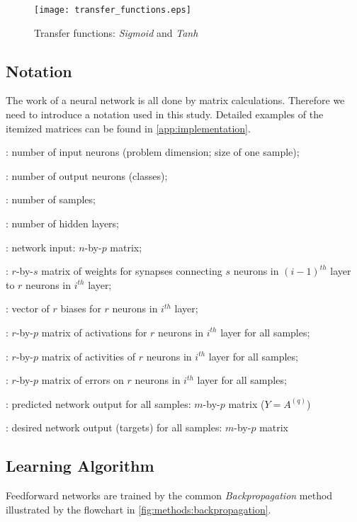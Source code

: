 \begin{figure}[H]
  \centering
  \texttt{[image: transfer\_functions.eps]}
  \caption{Transfer functions: \textit{Sigmoid} and \textit{Tanh}}
  \label{fig:methods:transfer_functions}
\end{figure}

\subsection*{Notation}
The work of a neural network is all done by matrix calculations. Therefore we need to introduce a notation used in this study. Detailed examples of the itemized matrices can be found in \cref{app:implementation}.

\begin{description}[leftmargin=!,labelwidth=\widthof{\bfseries $ W^{(i)} $}]
\item[$ n $] : number of input neurons (problem dimension; size of one sample);
\item[$ m $] : number of output neurons (classes);
\item[$ p $] : number of samples;
\item[$ q $] : number of hidden layers;
\item[$ X $] : network input: $ n $-by-$ p $ matrix;
\item[$ W^{(i)} $] : $ r $-by-$ s $ matrix of weights for synapses connecting $ s $ neurons in $ (i-1)^{th} $ layer to $ r $ neurons in $ i^{th} $ layer;
\item[$ B^{(i)} $] : vector of $ r $ biases for $ r $ neurons in $ i^{th} $ layer;
\item[$ Z^{(i)} $] : $ r $-by-$ p $ matrix of activations for $ r $ neurons in $ i^{th} $ layer for all samples;
\item[$ A^{(i)} $] : $ r $-by-$ p $ matrix of activities of $ r $ neurons in $ i^{th} $ layer for all samples;
\item[$ \Delta^{(i)} $] : $ r $-by-$ p $ matrix of errors on $ r $ neurons in $ i^{th} $ layer for all samples;
\item[$ Y $] : predicted network output for all samples: $ m $-by-$ p $ matrix ($ Y = A^{(q)} $)
\item[$ U $] : desired network output (targets) for all samples: $ m $-by-$ p $ matrix
\end{description}

\subsection*{Learning Algorithm}
Feedforward networks are trained by the common \textit{Backpropagation} method illustrated by the flowchart in \cref{fig:methods:backpropagation}.

